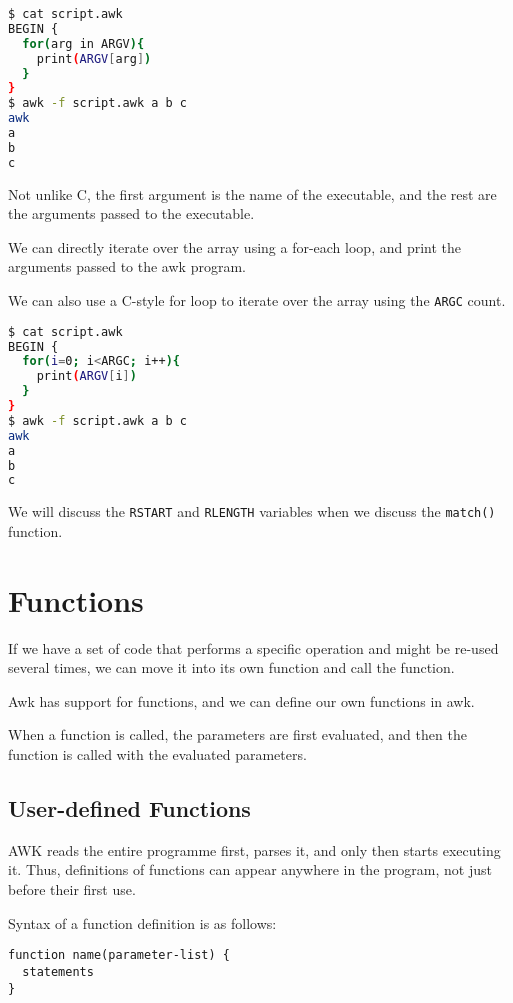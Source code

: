 \begin{lstlisting}[language=bash]
$ cat script.awk
BEGIN {
  for(arg in ARGV){
    print(ARGV[arg])
  }
}
$ awk -f script.awk a b c
awk
a
b
c
\end{lstlisting}

Not unlike C, the first argument is the name of the executable, and the rest are the arguments passed to the executable.

We can directly iterate over the array using a for-each loop, and print the arguments passed to the awk program.

We can also use a C-style for loop to iterate over the array using the \lstinline|ARGC| count.

\begin{lstlisting}[language=bash]
$ cat script.awk
BEGIN {
  for(i=0; i<ARGC; i++){
    print(ARGV[i])
  }
}
$ awk -f script.awk a b c
awk
a
b
c
\end{lstlisting}

We will discuss the \lstinline|RSTART| and \lstinline|RLENGTH| variables when we discuss the \lstinline|match()| function.

\section{Functions}

If we have a set of code that performs a specific operation and might be re-used several times, we can move it into its own function and call the function.

Awk has support for functions, and we can define our own functions in awk.

When a function is called, the parameters are first evaluated, and then the function is called with the evaluated parameters.

\subsection{User-defined Functions}

AWK reads the entire programme first, parses it, and only then starts executing it.
Thus, definitions of functions can appear anywhere in the program, not just before their first use.

Syntax of a function definition is as follows:

\begin{lstlisting}
function name(parameter-list) {
  statements
}
\end{lstlisting}

